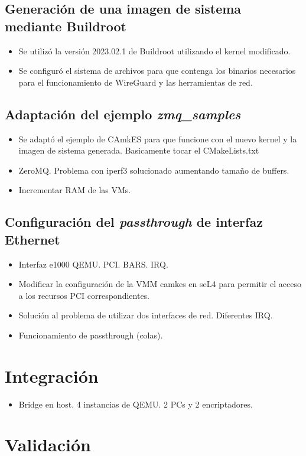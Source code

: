 \subsection{Generación de una imagen de sistema mediante Buildroot}
\begin{itemize}
    \item Se utilizó la versión 2023.02.1 de Buildroot utilizando el kernel modificado.
    \item Se configuró el sistema de archivos para que contenga los binarios necesarios para el funcionamiento de WireGuard y las herramientas de red.
\end{itemize}

\subsection{Adaptación del ejemplo \textit{zmq\_samples}}
\begin{itemize}
    \item Se adaptó el ejemplo de CAmkES para que funcione con el nuevo kernel y la imagen de sistema generada. Basicamente tocar el CMakeLists.txt
    \item ZeroMQ. Problema con iperf3 solucionado aumentando tamaño de buffers.
    \item Incrementar RAM de las VMs.
\end{itemize}

\subsection{Configuración del \textit{passthrough} de interfaz Ethernet}
\begin{itemize}
    \item Interfaz e1000 QEMU. PCI. BARS. IRQ.
    \item Modificar la configuración de la VMM camkes en seL4 para permitir el acceso a los recursos PCI correspondientes.
    \item Solución al problema de utilizar dos interfaces de red. Diferentes IRQ.
    \item Funcionamiento de passthrough (colas).
\end{itemize}

\section{Integración}
\begin{itemize}
    \item Bridge en host. 4 instancias de QEMU. 2 PCs y 2 encriptadores.
\end{itemize}

\section{Validación} %
